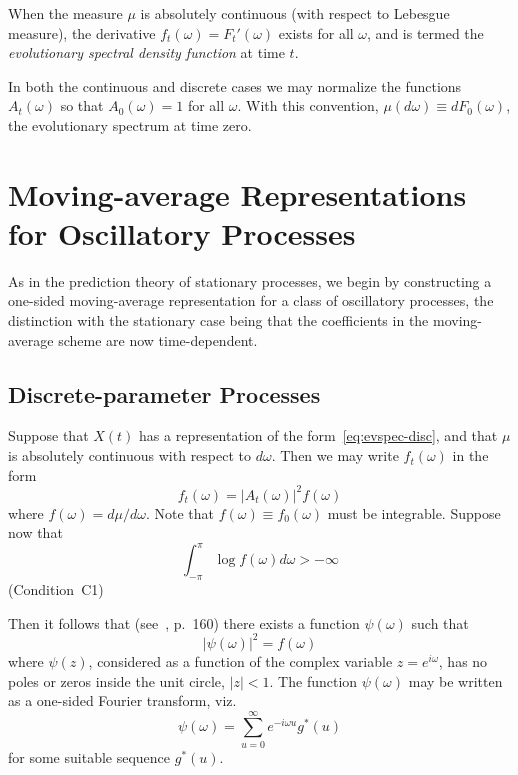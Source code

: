 \documentclass[11pt]{article}
\begin{document}
When the measure $\mu$ is absolutely continuous (with respect to Lebesgue measure), the derivative $f_t(\omega) = F_t'(\omega)$ exists for all $\omega$, and is termed the \emph{evolutionary spectral density function} at time $t$.

In both the continuous and discrete cases we may normalize the functions $A_t(\omega)$ so that $A_0(\omega) = 1$ for all $\omega$. With this convention, $\mu(d\omega) \equiv dF_0(\omega)$, the evolutionary spectrum at time zero.

\section{Moving-average Representations for Oscillatory Processes}

As in the prediction theory of stationary processes, we begin by constructing a one-sided moving-average representation for a class of oscillatory processes, the distinction with the stationary case being that the coefficients in the moving-average scheme are now time-dependent.

\subsection{Discrete-parameter Processes}

Suppose that $X(t)$ has a representation of the form~\eqref{eq:evspec-disc}, and that $\mu$ is absolutely continuous with respect to $d\omega$. Then we may write $f_t(\omega)$ in the form
\begin{equation}
f_t(\omega) = |A_t(\omega)|^2 f(\omega)
\label{eq:ftA}
\end{equation}
where $f(\omega) = d\mu/d\omega$. Note that $f(\omega) \equiv f_0(\omega)$ must be integrable. Suppose now that
\begin{equation}
\int_{-\pi}^{\pi} \log f(\omega) d\omega > -\infty
\label{eq:C1}
\end{equation}
(Condition~C1)

Then it follows that (see~\cite{Doob1953}, p.~160) there exists a function $\psi(\omega)$ such that
\begin{equation}
|\psi(\omega)|^2 = f(\omega)
\label{eq:psi}
\end{equation}
where $\psi(z)$, considered as a function of the complex variable $z = e^{i\omega}$, has no poles or zeros inside the unit circle, $|z| < 1$. The function $\psi(\omega)$ may be written as a one-sided Fourier transform, viz.
\begin{equation}
\psi(\omega) = \sum_{u=0}^{\infty} e^{-i\omega u} g^*(u)
\label{eq:psiFT}
\end{equation}
for some suitable sequence $g^*(u)$.
\end{document}

